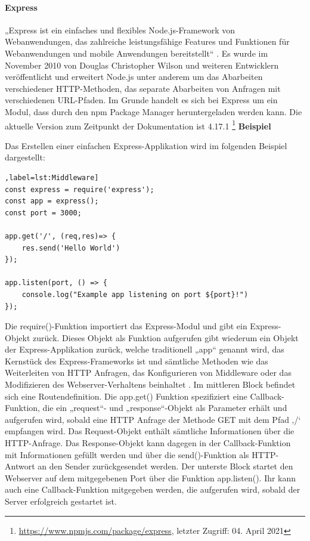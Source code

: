 \paragraph{Express}
„Express ist ein einfaches und flexibles Node.js-Framework von Webanwendungen, das zahlreiche leistungsfähige Features und Funktionen für Webanwendungen und mobile Anwendungen bereitstellt“ \cite{Node1.6}.  Es wurde im November 2010 von Douglas Christopher Wilson und weiteren Entwicklern veröffentlicht und erweitert Node.js unter anderem um das Abarbeiten verschiedener HTTP-Methoden, das separate Abarbeiten von Anfragen mit verschiedenen URL-Pfaden. Im Grunde handelt es sich bei Express um ein Modul, dass durch den npm Package Manager heruntergeladen werden kann. Die aktuelle Version zum Zeitpunkt der Dokumentation ist 4.17.1 \footnote{\url{https://www.npmjs.com/package/express}, letzter Zugriff: 04. April 2021}
\newline
\newline
\textbf{Beispiel}
\newline

\noindent
Das Erstellen einer einfachen Express-Applikation wird im folgenden Beispiel dargestellt:\newline

\begin{lstlisting}[caption=Einfacher Webserver [nodejs 1.8],label=lst:Middleware]
const express = require('express');
const app = express();
const port = 3000;

app.get('/', (req,res)=> {
	res.send('Hello World')
});

app.listen(port, () => {
	console.log("Example app listening on port ${port}!")
});
\end{lstlisting}

\noindent
Die require()-Funktion importiert das Express-Modul und gibt ein Express-Objekt zurück. 
Dieses Objekt als Funktion aufgerufen gibt wiederum ein Objekt der Express-Applikation zurück, welche traditionell „app“ genannt wird, das Kernstück des Express-Frameworks ist und sämtliche Methoden wie das Weiterleiten von HTTP Anfragen, das Konfigurieren von Middleware oder das Modifizieren des Webserver-Verhaltens beinhaltet \cite{Node1.8}.
\newline
\noindent
Im mittleren Block befindet sich eine Routendefinition. Die app.get() Funktion spezifiziert eine Callback-Funktion, die ein „request“- und „response“-Objekt als Parameter erhält und aufgerufen wird, sobald eine HTTP Anfrage der Methode GET mit dem Pfad ‚/‘ empfangen wird. Das Request-Objekt enthält sämtliche Informationen über die HTTP-Anfrage. Das Response-Objekt kann dagegen in der Callback-Funktion mit Informationen gefüllt werden und über die send()-Funktion als HTTP-Antwort an den Sender zurückgesendet werden.
\newline
\noindent
Der unterste Block startet den Webserver auf dem mitgegebenen Port über die Funktion app.listen(). Ihr kann auch eine Callback-Funktion mitgegeben werden, die aufgerufen wird, sobald der Server erfolgreich gestartet ist.
\newpage

